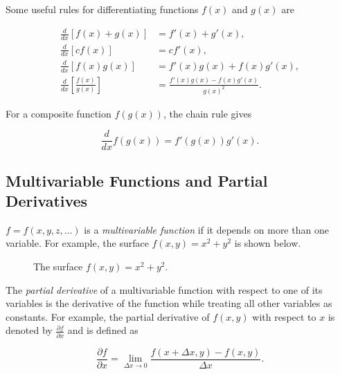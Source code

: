\documentclass[../main.tex]{subfiles}
\begin{document}
Some useful rules for differentiating functions \(f(x)\) and \(g(x)\) are

	\begin{align*}
	\frac{d}{dx}[f(x)+g(x)]
	&= f'(x)+g'(x), \\
	\frac{d}{dx}[c f(x)]
	&= c f'(x), \\
	\frac{d}{dx}[f(x)g(x)]
	&= f'(x)g(x)+f(x)g'(x), \\
	\frac{d}{dx}\left[\frac{f(x)}{g(x)}\right]
	&=
	\frac{f'(x)g(x)-f{(x)}g'{(x)}}{{g(x)}^2}.
\end{align*}

For a composite function \(f(g(x))\), the chain rule gives

\[
\frac{d}{dx}f(g(x))
=
f'(g(x))g'(x).
\]

\subsection{Multivariable Functions and Partial Derivatives}
$f=f(x,y,z,\hdots)$ is a \emph{multivariable function} if it depends on more than one variable. For example, the surface $f(x,y)=x^2+y^2$ is shown below.

\begin{figure}[h]
\centering
{}
\caption{The surface $f(x,y)=x^2+y^2$.}
\end{figure}

The \emph{partial derivative} of a multivariable function with respect to one of its variables is the derivative of the function while treating all other variables as constants. For example, the partial derivative of \(f(x,y)\) with respect to \(x\) is denoted by \(\frac{\partial f}{\partial x}\) and is defined as

\[
\frac{\partial f}{\partial x}
=
\lim_{\Delta x \to 0}
\frac{f(x+\Delta x,y)-f(x,y)}{\Delta x}.
\]
\end{document}
